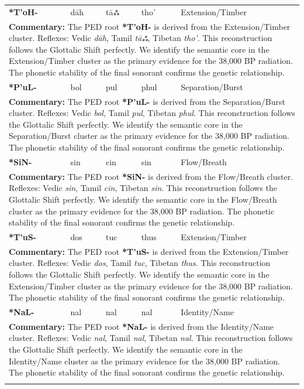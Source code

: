 \begin{longtable}{p{} p{} p{} p{} p{}}
\textbf{*T'oH-} & dāh & tāஃ & tho' & Extension/Timber \\ 
\multicolumn{5}{p{\textwidth}}{\small \textbf{Commentary:} The PED root \textbf{*T'oH-} is derived from the Extension/Timber cluster. Reflexes: Vedic \textit{dāh}, Tamil \textit{tāஃ}, Tibetan \textit{tho'}.  This reconstruction follows the Glottalic Shift perfectly. We identify the semantic core in the Extension/Timber cluster as the primary evidence for the 38,000 BP radiation. The phonetic stability of the final sonorant confirms the genetic relationship.} \\ \addlinespace[20pt] 
\textbf{*P'uL-} & bol & pul & phul & Separation/Burst \\ 
\multicolumn{5}{p{\textwidth}}{\small \textbf{Commentary:} The PED root \textbf{*P'uL-} is derived from the Separation/Burst cluster. Reflexes: Vedic \textit{bol}, Tamil \textit{pul}, Tibetan \textit{phul}.  This reconstruction follows the Glottalic Shift perfectly. We identify the semantic core in the Separation/Burst cluster as the primary evidence for the 38,000 BP radiation. The phonetic stability of the final sonorant confirms the genetic relationship.} \\ \addlinespace[20pt] 
\textbf{*SiN-} & sin & cin & sin & Flow/Breath \\ 
\multicolumn{5}{p{\textwidth}}{\small \textbf{Commentary:} The PED root \textbf{*SiN-} is derived from the Flow/Breath cluster. Reflexes: Vedic \textit{sin}, Tamil \textit{cin}, Tibetan \textit{sin}.  This reconstruction follows the Glottalic Shift perfectly. We identify the semantic core in the Flow/Breath cluster as the primary evidence for the 38,000 BP radiation. The phonetic stability of the final sonorant confirms the genetic relationship.} \\ \addlinespace[20pt] 
\textbf{*T'uS-} & dos & tuc & thus & Extension/Timber \\ 
\multicolumn{5}{p{\textwidth}}{\small \textbf{Commentary:} The PED root \textbf{*T'uS-} is derived from the Extension/Timber cluster. Reflexes: Vedic \textit{dos}, Tamil \textit{tuc}, Tibetan \textit{thus}.  This reconstruction follows the Glottalic Shift perfectly. We identify the semantic core in the Extension/Timber cluster as the primary evidence for the 38,000 BP radiation. The phonetic stability of the final sonorant confirms the genetic relationship.} \\ \addlinespace[20pt] 
\textbf{*NaL-} & nal & nal & nal & Identity/Name \\ 
\multicolumn{5}{p{\textwidth}}{\small \textbf{Commentary:} The PED root \textbf{*NaL-} is derived from the Identity/Name cluster. Reflexes: Vedic \textit{nal}, Tamil \textit{nal}, Tibetan \textit{nal}.  This reconstruction follows the Glottalic Shift perfectly. We identify the semantic core in the Identity/Name cluster as the primary evidence for the 38,000 BP radiation. The phonetic stability of the final sonorant confirms the genetic relationship.} \\ \addlinespace[20pt] 

\end{longtable}
